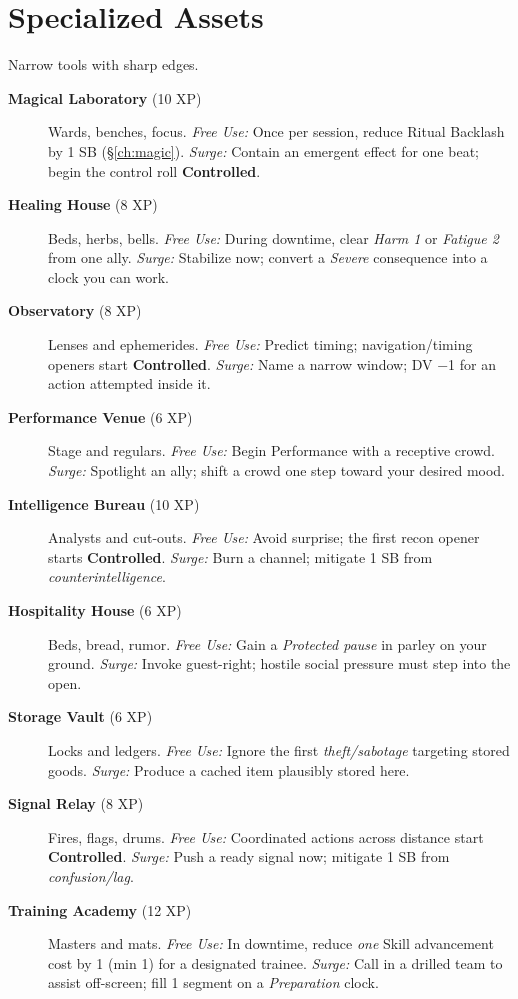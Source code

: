 \section{Specialized Assets}
Narrow tools with sharp edges.
\begin{description}
  \item[\textbf{Magical Laboratory} (10 XP)]  Wards, benches, focus. \emph{Free Use:} Once per session, reduce Ritual Backlash by 1 SB (\S\ref{ch:magic}). \emph{Surge:} Contain an emergent effect for one beat; begin the control roll \textbf{Controlled}.
  \item[\textbf{Healing House} (8 XP)]  Beds, herbs, bells. \emph{Free Use:} During downtime, clear \emph{Harm 1} or \emph{Fatigue 2} from one ally. \emph{Surge:} Stabilize now; convert a \emph{Severe} consequence into a clock you can work.
  \item[\textbf{Observatory} (8 XP)]  Lenses and ephemerides. \emph{Free Use:} Predict timing; navigation/timing openers start \textbf{Controlled}. \emph{Surge:} Name a narrow window; DV −1 for an action attempted inside it.
  \item[\textbf{Performance Venue} (6 XP)]  Stage and regulars. \emph{Free Use:} Begin Performance with a receptive crowd. \emph{Surge:} Spotlight an ally; shift a crowd one step toward your desired mood.
  \item[\textbf{Intelligence Bureau} (10 XP)]  Analysts and cut-outs. \emph{Free Use:} Avoid surprise; the first recon opener starts \textbf{Controlled}. \emph{Surge:} Burn a channel; mitigate 1 SB from \emph{counterintelligence}.
  \item[\textbf{Hospitality House} (6 XP)]  Beds, bread, rumor. \emph{Free Use:} Gain a \emph{Protected pause} in parley on your ground. \emph{Surge:} Invoke guest-right; hostile social pressure must step into the open.
  \item[\textbf{Storage Vault} (6 XP)]  Locks and ledgers. \emph{Free Use:} Ignore the first \emph{theft/sabotage} targeting stored goods. \emph{Surge:} Produce a cached item plausibly stored here.
  \item[\textbf{Signal Relay} (8 XP)]  Fires, flags, drums. \emph{Free Use:} Coordinated actions across distance start \textbf{Controlled}. \emph{Surge:} Push a ready signal now; mitigate 1 SB from \emph{confusion/lag}.
  \item[\textbf{Training Academy} (12 XP)]  Masters and mats. \emph{Free Use:} In downtime, reduce \emph{one} Skill advancement cost by 1 (min 1) for a designated trainee. \emph{Surge:} Call in a drilled team to assist off-screen; fill 1 segment on a \emph{Preparation} clock.
\end{description}

